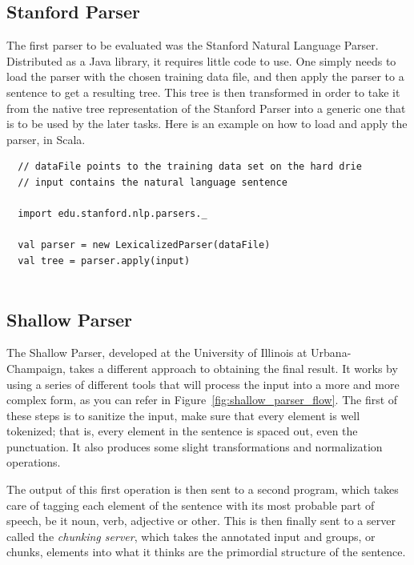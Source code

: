 
\subsection{Stanford Parser} %
\label{sub:stanford_parser_impl}

The first parser to be evaluated was the Stanford Natural Language Parser. Distributed as a Java library, it requires little code to use. One simply needs to load the parser with the chosen training data file, and then apply the parser to a sentence to get a resulting tree. This tree is then transformed in order to take it from the native tree representation of the Stanford Parser into a generic one that is to be used by the later tasks. Here is an example on how to load and apply the parser, in Scala.

\begin{verbatim}
  // dataFile points to the training data set on the hard drie
  // input contains the natural language sentence
  
  import edu.stanford.nlp.parsers._
  
  val parser = new LexicalizedParser(dataFile)
  val tree = parser.apply(input)
  
\end{verbatim}



\subsection{Shallow Parser} %
\label{sub:shallow_parser}

The Shallow Parser, developed at the University of Illinois at Urbana-Champaign, takes a different approach to obtaining the final result. It works by using a series of different tools that will process the input into a more and more complex form, as you can refer in Figure~\ref{fig:shallow_parser_flow}. The first of these steps is to sanitize the input, make sure that every element is well tokenized; that is, every element in the sentence is spaced out, even the punctuation. It also produces some slight transformations and normalization operations.

The output of this first operation is then sent to a second program, which takes care of tagging each element of the sentence with its most probable part of speech, be it noun, verb, adjective or other. This is then finally sent to a server called the \emph{chunking server}, which takes the annotated input and groups, or chunks, elements into what it thinks are the primordial structure of the sentence.


